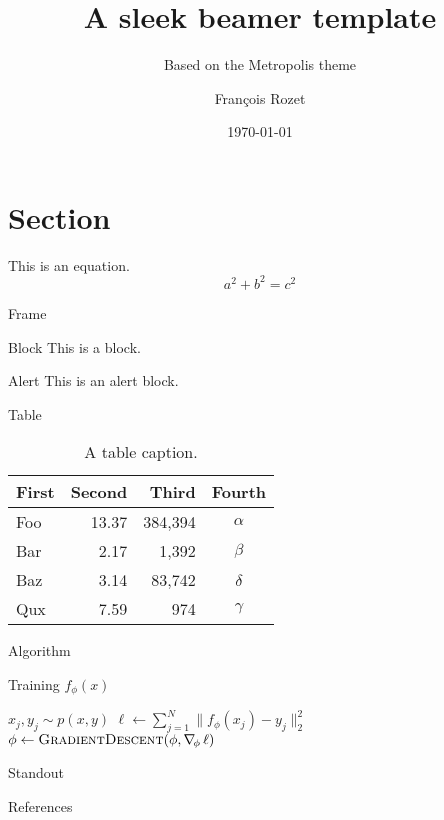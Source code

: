 \documentclass[11pt]{beamer}
\title{A sleek beamer template}
\subtitle{Based on the Metropolis theme}
\author{François Rozet}
\institute{University of Liège}
\date{\today}
\begin{document}
\maketitle

\section{Section}

\begin{frame}
    This is an equation. $$ a^2 + b^2 = c^2 $$
\end{frame}

\begin{frame}{Frame}
    \begin{block}{Block}
        This is a block.
    \end{block}

    \begin{alertblock}{Alert}
        This is an \alert{alert} block.
    \end{alertblock}

\end{frame}

\begin{frame}{Table}
    \begin{table}
        \centering
        \begin{tabular}{lrrc}
            \toprule
            \textbf{First} & \textbf{Second} & \textbf{Third} & \textbf{Fourth} \\
            \midrule
            Foo & 13.37 & 384,394 & $\alpha$ \\
            Bar & 2.17 & 1,392 & $\beta$ \\
            Baz & 3.14 & 83,742 & $\delta$ \\
            Qux & 7.59 & 974 & $\gamma$ \\
            \bottomrule
        \end{tabular}
        \caption{A table caption.}
    \end{table}
\end{frame}

\begin{frame}{Algorithm}
    \begin{algorithm}[H]
        \caption{Training $f_\phi(x)$} \label{alg:training}
        \begin{algorithmic}[1]
            \vspace{-0.5em}
                    \State $x_j, y_j \sim p(x, y)$
                \EndFor{}
                \State $\ell \gets \sum_{j=1}^N \| f_\phi(x_j) - y_j \|_2^2$
                \State $\phi \gets \Call{GradientDescent}{\phi, \nabla_{\!\phi} \, \ell}$
            \EndFor{}
	    \end{algorithmic}
    \end{algorithm}
\end{frame}

\begin{frame}[standout]
    Standout
\end{frame}

\begin{frame}[allowframebreaks]{References}
    \nocite{einstein}
    \nocite{knuthwebsite}
    \nocite{dirac}
    \printbibliography[heading=none]
\end{frame}
\end{document}
